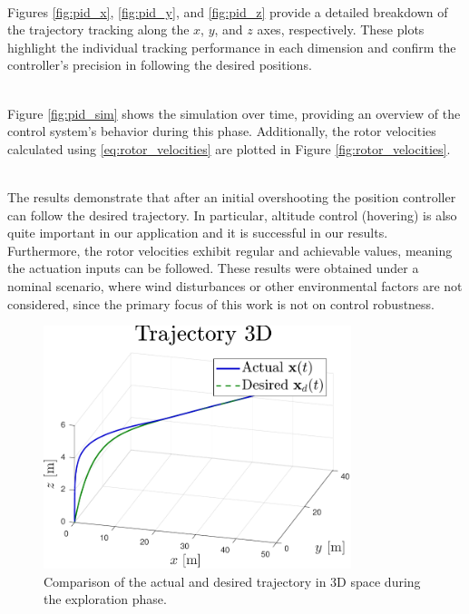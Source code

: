 \documentclass[main]{subfiles}
\begin{document}
\noindent\\
Figures \ref{fig:pid_x}, \ref{fig:pid_y}, and \ref{fig:pid_z}
provide a detailed breakdown of the trajectory tracking along 
the \(x\), \(y\), and \(z\) axes, respectively. 
These plots highlight the individual tracking performance 
in each dimension and confirm the controller's precision 
in following the desired positions.


\noindent\\
Figure \ref{fig:pid_sim} shows the simulation over time,
providing an overview of the control system's behavior 
during this phase. Additionally, the rotor velocities 
calculated using \eqref{eq:rotor_velocities} are plotted 
in Figure \ref{fig:rotor_velocities}. 

\noindent\\
The results demonstrate
that after an initial overshooting the position controller
can follow the desired trajectory.
In particular, altitude control (hovering) is also quite important in our application
and it is successful in our results.
Furthermore, the rotor velocities exhibit regular and achievable values,
meaning the actuation inputs can be followed.
These results were obtained under a nominal scenario, 
where wind disturbances or other environmental factors are not considered,
since the primary focus of this work is not on control robustness.
\begin{figure}
    \centering
    \includegraphics[width=0.8\textwidth]{images/trajectory_comparison.pdf}
    \caption[3D Trajectory Tracking]{Comparison of the actual and desired trajectory in 3D space during the exploration phase.}
    \label{fig:pd_traj_comparison}
\end{figure}
\end{document}
